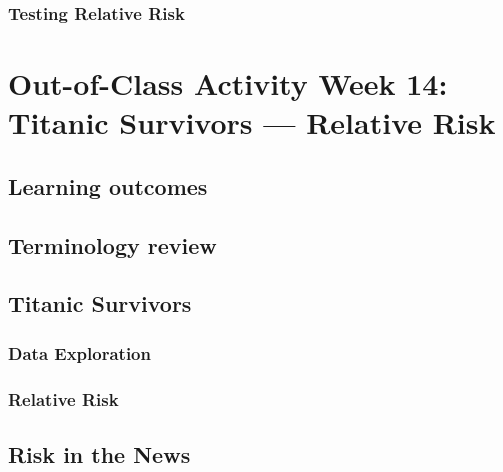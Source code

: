 \documentclass[
]{report}
\begin{document}
\hypertarget{testing-relative-risk}{%
\subsubsection*{Testing Relative Risk}\label{testing-relative-risk}}

\hypertarget{out-of-class-activity-week-14-titanic-survivors-relative-risk}{%
\section{Out-of-Class Activity Week 14: Titanic Survivors --- Relative Risk}\label{out-of-class-activity-week-14-titanic-survivors-relative-risk}}

\hypertarget{learning-outcomes-28}{%
\subsection{Learning outcomes}\label{learning-outcomes-28}}

\hypertarget{terminology-review-23}{%
\subsection{Terminology review}\label{terminology-review-23}}

\hypertarget{titanic-survivors}{%
\subsection{Titanic Survivors}\label{titanic-survivors}}

\hypertarget{data-exploration}{%
\subsubsection*{Data Exploration}\label{data-exploration}}

\hypertarget{relative-risk-1}{%
\subsubsection*{Relative Risk}\label{relative-risk-1}}

\hypertarget{risk-in-the-news}{%
\subsection{Risk in the News}\label{risk-in-the-news}}
\end{document}
